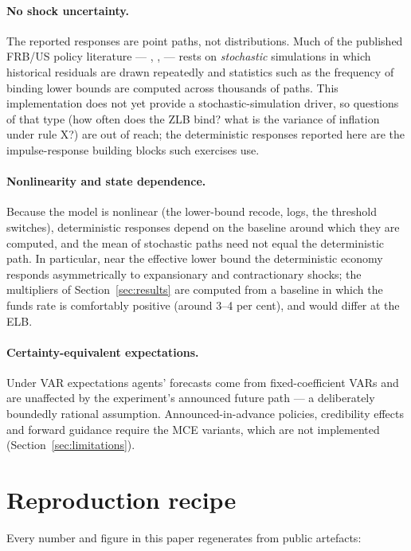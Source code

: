 \paragraph{No shock uncertainty.} The reported responses are point paths, not distributions. Much of the published FRB/US policy literature --- \citet{reifschneider2000three}, \citet{reifschneider2016gauging}, \citet{bernanke2019strategies} --- rests on \emph{stochastic} simulations in which historical residuals are drawn repeatedly and statistics such as the frequency of binding lower bounds are computed across thousands of paths. This implementation does not yet provide a stochastic-simulation driver, so questions of that type (how often does the ZLB bind? what is the variance of inflation under rule X?) are out of reach; the deterministic responses reported here are the impulse-response building blocks such exercises use.

\paragraph{Nonlinearity and state dependence.} Because the model is nonlinear (the lower-bound recode, logs, the threshold switches), deterministic responses depend on the baseline around which they are computed, and the mean of stochastic paths need not equal the deterministic path. In particular, near the effective lower bound the deterministic economy responds asymmetrically to expansionary and contractionary shocks; the multipliers of Section~\ref{sec:results} are computed from a baseline in which the funds rate is comfortably positive (around 3--4 per cent), and would differ at the ELB.

\paragraph{Certainty-equivalent expectations.} Under VAR expectations agents' forecasts come from fixed-coefficient VARs and are unaffected by the experiment's announced future path --- a deliberately boundedly rational assumption. Announced-in-advance policies, credibility effects and forward guidance require the MCE variants, which are not implemented (Section~\ref{sec:limitations}).

\section{Reproduction recipe}
\label{app:repro}

Every number and figure in this paper regenerates from public artefacts:

